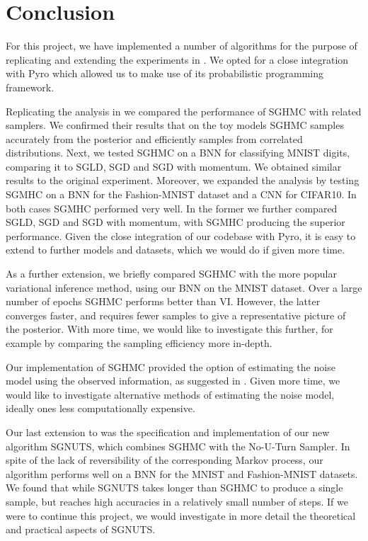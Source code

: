 
\section{Conclusion}

For this project, we have implemented a number of algorithms for the purpose of replicating and extending the experiments in \cite{sghmc}. We opted for a close integration with Pyro which allowed us to make use of its probabilistic programming framework. 

Replicating the analysis in \cite{sghmc} we compared the performance of SGHMC with related samplers. We confirmed their results that on the toy models SGHMC samples accurately from the posterior and efficiently samples from correlated distributions. Next, we tested SGHMC on a BNN for classifying MNIST digits, comparing it to SGLD, SGD and SGD with momentum. We obtained similar results to the original experiment. Moreover, we expanded the analysis by testing SGMHC on a BNN for the Fashion-MNIST dataset and a CNN for CIFAR10. In both cases SGMHC performed very well. In the former we further compared SGLD, SGD and SGD with momentum, with SGMHC producing the superior performance. Given the close integration of our codebase with Pyro, it is easy to extend to further models and datasets, which we would do if given more time.

As a further extension, we briefly compared SGHMC with the more popular variational inference method, using our BNN on the MNIST dataset. Over a large number of epochs SGHMC performs better than VI. However, the latter converges faster, and requires fewer samples to give a representative picture of the posterior. With more time, we would like to investigate this further, for example by comparing the sampling efficiency more in-depth.

Our implementation of SGHMC provided the option of estimating the noise model using the observed information, as suggested in \cite{sghmc}. Given more time, we would like to investigate alternative methods of estimating the noise model, ideally ones less computationally expensive.

Our last extension to \cite{sghmc} was the specification and implementation of our new algorithm SGNUTS, which combines SGHMC with the No-U-Turn Sampler. In spite of the lack of reversibility of the corresponding Markov process, our algorithm performs well on a BNN for the MNIST and Fashion-MNIST datasets. We found that while SGNUTS takes longer than SGHMC to produce a single sample, but reaches high accuracies in a relatively small number of steps. If we were to continue this project, we would investigate in more detail the theoretical and practical aspects of SGNUTS.